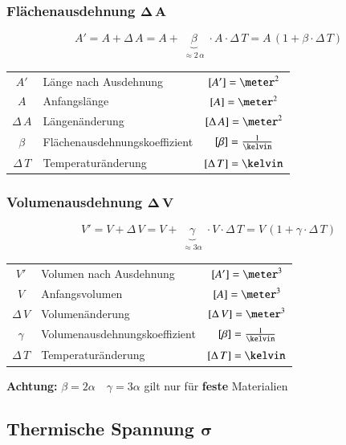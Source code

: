 \subsubsection{Flächenausdehnung $\bm{\Delta \, A}$}

\vspace{-0.2cm}

$$ \boxed{ A' = A + \Delta \,  A = A + \underbrace{  \beta }_{\substack{\approx 2 \, \alpha}}  \cdot A \cdot \Delta \, T = A \, (1 + \beta \cdot \Delta \, T ) } $$


\begin{tabular}{c l c}
		$A'$ 			& Länge nach Ausdehnung 		& $[A'] = \meter^2$ 			\\
		$A$ 			& Anfangslänge 					& $[A] = \meter^2$ 				\\
		$\Delta \, A$	& Längenänderung 				& $[\Delta \, A] = \meter^2$ 	\\
		$\beta$ 		& Flächenausdehnungskoeffizient & $[\beta] = \frac{1}{\kelvin}$ \\ 
		$\Delta \, T $ 	& Temperaturänderung 			& $[\Delta \, T ] = \kelvin$
\end{tabular}


\subsubsection{Volumenausdehnung $\bm{\Delta \, V}$}

\vspace{-0.2cm}

$$ \boxed{ V' = V + \Delta \,  V = V + \underbrace{  \gamma }_{\substack{\approx 3\alpha}}  \cdot V \cdot \Delta \, T = V \, (1 + \gamma \cdot \Delta \, T ) }$$


\begin{tabular}{c l c}
		$V'$ 			& Volumen nach Ausdehnung 		& $[A'] = \meter^3$ 			\\
		$V$ 			& Anfangsvolumen 				& $[A] = \meter^3$ 				\\
		$\Delta \, V$ 	& Volumenänderung 				& $[\Delta \, V] = \meter^3$ 	\\
		$\gamma$ 
 		& Volumenausdehnungskoeffizient & $[\beta] = \frac{1}{\kelvin}$ \\ 
		$\Delta \, T$ 	& Temperaturänderung 			& $[\Delta \, T ] = \kelvin$
\end{tabular}\medskip

\textbf{Achtung:} $\beta = 2\alpha \quad \gamma = 3\alpha$ gilt nur für \textbf{feste} Materialien

\subsection[Thermische Spannung]{Thermische Spannung $\bm{\sigma}$}

